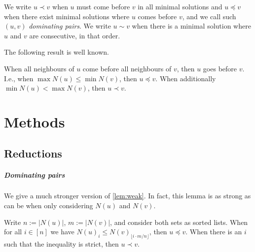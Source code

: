 \documentclass[a4paper,UKenglish,cleveref, autoref, thm-restate]{lipics-v2021}
\renewcommand{\b}{\prec}
\newcommand{\be}{\preceq}
\newcommand{\g}{\sim}
\begin{document}
We write $u\b v$ when $u$ must come before $v$ in all minimal solutions and
$u\be v$ when there exist minimal solutions where $u$ comes before $v$, and we
call such $(u,v)$ \emph{dominating pairs}.
We write $u\g v$ when there is a minimal solution where $u$ and $v$ are
consecutive, in that order.

The following result is well known.

\begin{observation}\label{lem:weak}
  When all neighbours of $u$ come before all neighbours of $v$, then $u$ goes
  before $v$. I.e., when $\max N(u) \leq \min N(v)$, then $u\be v$.
  When additionally ${\min N(u) < \max N(v)}$, then $u\b v$.
\end{observation}

\section{Methods}
\subsection{Reductions}
\subparagraph{Dominating pairs}
We give a much stronger version of \cref{lem:weak}. In fact, this
lemma is as strong as can be when only considering $N(u)$ and $N(v)$.

\begin{lemma}\label{lem:sdp}
  Write $n:= |N(u)|$, $m:=|N(v)|$, and consider both sets as sorted lists.
  When for all $i\in [n]$ we have
  $ N(u)_i \leq N(v)_{\lfloor i\cdot m/n \rfloor} $,
  then $u\be v$.
  When there is an $i$ such that the inequality is strict, then $u\b v$.
\end{lemma}

\end{document}
